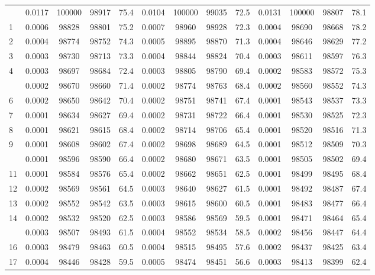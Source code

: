 \documentclass[
  14pt,
]{article}
\begin{document}
\begin{longtable}[t]{lcccccccccccc}
\endfoot
\bottomrule
\endlastfoot
0 & 0.0117 & 100000 & 98917 & 75.4 & 0.0104 & 100000 & 99035 & 72.5 & 0.0131 & 100000 & 98807 & 78.1\\
1 & 0.0006 & 98828 & 98801 & 75.2 & 0.0007 & 98960 & 98928 & 72.3 & 0.0004 & 98690 & 98668 & 78.2\\
2 & 0.0004 & 98774 & 98752 & 74.3 & 0.0005 & 98895 & 98870 & 71.3 & 0.0004 & 98646 & 98629 & 77.2\\
3 & 0.0003 & 98730 & 98713 & 73.3 & 0.0004 & 98844 & 98824 & 70.4 & 0.0003 & 98611 & 98597 & 76.3\\
4 & 0.0003 & 98697 & 98684 & 72.4 & 0.0003 & 98805 & 98790 & 69.4 & 0.0002 & 98583 & 98572 & 75.3\\
\addlinespace
5 & 0.0002 & 98670 & 98660 & 71.4 & 0.0002 & 98774 & 98763 & 68.4 & 0.0002 & 98560 & 98552 & 74.3\\
6 & 0.0002 & 98650 & 98642 & 70.4 & 0.0002 & 98751 & 98741 & 67.4 & 0.0001 & 98543 & 98537 & 73.3\\
7 & 0.0001 & 98634 & 98627 & 69.4 & 0.0002 & 98731 & 98722 & 66.4 & 0.0001 & 98530 & 98525 & 72.3\\
8 & 0.0001 & 98621 & 98615 & 68.4 & 0.0002 & 98714 & 98706 & 65.4 & 0.0001 & 98520 & 98516 & 71.3\\
9 & 0.0001 & 98608 & 98602 & 67.4 & 0.0002 & 98698 & 98689 & 64.5 & 0.0001 & 98512 & 98509 & 70.3\\
\addlinespace
10 & 0.0001 & 98596 & 98590 & 66.4 & 0.0002 & 98680 & 98671 & 63.5 & 0.0001 & 98505 & 98502 & 69.4\\
11 & 0.0001 & 98584 & 98576 & 65.4 & 0.0002 & 98662 & 98651 & 62.5 & 0.0001 & 98499 & 98495 & 68.4\\
12 & 0.0002 & 98569 & 98561 & 64.5 & 0.0003 & 98640 & 98627 & 61.5 & 0.0001 & 98492 & 98487 & 67.4\\
13 & 0.0002 & 98552 & 98542 & 63.5 & 0.0003 & 98615 & 98600 & 60.5 & 0.0001 & 98483 & 98477 & 66.4\\
14 & 0.0002 & 98532 & 98520 & 62.5 & 0.0003 & 98586 & 98569 & 59.5 & 0.0001 & 98471 & 98464 & 65.4\\
\addlinespace
15 & 0.0003 & 98507 & 98493 & 61.5 & 0.0004 & 98552 & 98534 & 58.5 & 0.0002 & 98456 & 98447 & 64.4\\
16 & 0.0003 & 98479 & 98463 & 60.5 & 0.0004 & 98515 & 98495 & 57.6 & 0.0002 & 98437 & 98425 & 63.4\\
17 & 0.0004 & 98446 & 98428 & 59.5 & 0.0005 & 98474 & 98451 & 56.6 & 0.0003 & 98413 & 98399 & 62.4\\

\end{longtable}
\end{document}
